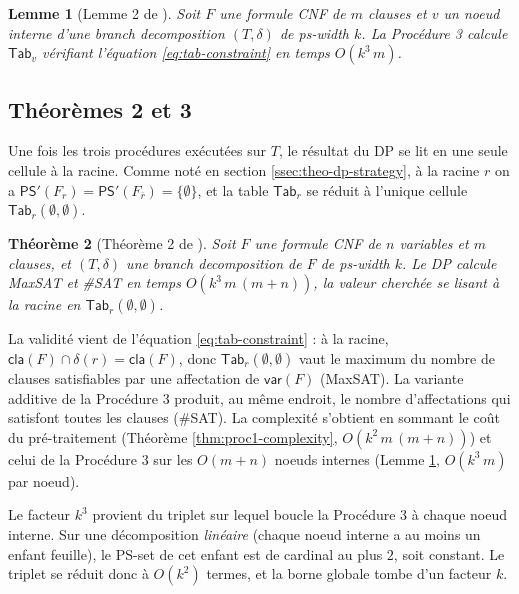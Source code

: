 \documentclass[11pt,a4paper]{report}
\theoremstyle{plain}
\newtheorem{theorem}{Théorème}[chapter]
\newtheorem{lemma}[theorem]{Lemme}
\theoremstyle{definition}
\begin{document}
\begin{lemma}[Lemme 2 de \cite{saether2015}]
\label{lem:proc3-complexity}
Soit $F$ une formule CNF de $m$ clauses et $v$ un noeud interne d'une
branch decomposition $(T, \delta)$ de ps-width $k$. La Procédure 3
calcule $\mathsf{Tab}_v$ vérifiant l'équation \eqref{eq:tab-constraint}
en temps $O(k^3\, m)$.
\end{lemma}

\subsection{Théorèmes 2 et 3}
\label{ssec:theo-th23}

Une fois les trois procédures exécutées sur $T$, le résultat du DP se
lit en une seule cellule à la racine. Comme noté en
section \ref{ssec:theo-dp-strategy}, à la racine $r$ on a
$\mathsf{PS}'(F_r) = \mathsf{PS}'(F_{\overline{r}}) = \{\emptyset\}$, et
la table $\mathsf{Tab}_r$ se réduit à l'unique cellule
$\mathsf{Tab}_r(\emptyset, \emptyset)$.

\begin{theorem}[Théorème 2 de \cite{saether2015}]
\label{thm:dp-total}
Soit $F$ une formule CNF de $n$ variables et $m$ clauses, et
$(T, \delta)$ une branch decomposition de $F$ de ps-width $k$. Le DP
calcule MaxSAT et \#SAT en temps $O(k^3\, m\, (m + n))$, la valeur
cherchée se lisant à la racine en $\mathsf{Tab}_r(\emptyset, \emptyset)$.
\end{theorem}

La validité vient de l'équation \eqref{eq:tab-constraint} : à la racine,
$\mathsf{cla}(F) \cap \delta(r) = \mathsf{cla}(F)$, donc
$\mathsf{Tab}_r(\emptyset, \emptyset)$ vaut le maximum du nombre de
clauses satisfiables par une affectation de $\mathsf{var}(F)$ (MaxSAT).
La variante additive de la Procédure 3 produit, au même endroit, le
nombre d'affectations qui satisfont toutes les clauses (\#SAT). La
complexité s'obtient en sommant le coût du pré-traitement
(Théorème \ref{thm:proc1-complexity}, $O(k^2\, m\, (m + n))$) et celui
de la Procédure 3 sur les $O(m + n)$ noeuds internes
(Lemme \ref{lem:proc3-complexity}, $O(k^3\, m)$ par noeud).

Le facteur $k^3$ provient du triplet sur lequel boucle la Procédure 3 à
chaque noeud interne. Sur une décomposition \emph{linéaire} (chaque noeud
interne a au moins un enfant feuille), le PS-set de cet enfant est de
cardinal au plus $2$, soit constant. Le triplet se réduit donc à
$O(k^2)$ termes, et la borne globale tombe d'un facteur $k$.
\end{document}
